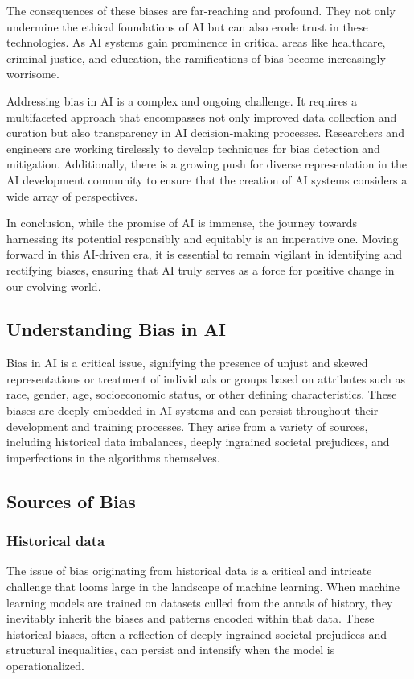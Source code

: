 \documentclass[12pt,a4paper,openright,twoside]{book}
\begin{document}
The consequences of these biases are far-reaching and profound. They not only undermine the ethical foundations of AI but can also erode trust in these technologies. As AI systems gain prominence in critical areas like healthcare, criminal justice, and education, the ramifications of bias become increasingly worrisome. 

Addressing bias in AI is a complex and ongoing challenge. It requires a multifaceted approach that encompasses not only improved data collection and curation but also transparency in AI decision-making processes. Researchers and engineers are working tirelessly to develop techniques for bias detection and mitigation. Additionally, there is a growing push for diverse representation in the AI development community to ensure that the creation of AI systems considers a wide array of perspectives. 

In conclusion, while the promise of AI is immense, the journey towards harnessing its potential responsibly and equitably is an imperative one. Moving forward in this AI-driven era, it is essential to remain vigilant in identifying and rectifying biases, ensuring that AI truly serves as a force for positive change in our evolving world. \cite{10.1145/3308560.3317590}

\subsection{Understanding Bias in AI}

Bias in AI is a critical issue, signifying the presence of unjust and skewed representations or treatment of individuals or groups based on attributes such as race, gender, age, socioeconomic status, or other defining characteristics. These biases are deeply embedded in AI systems and can persist throughout their development and training processes. They arise from a variety of sources, including historical data imbalances, deeply ingrained societal prejudices, and imperfections in the algorithms themselves.

\subsection{Sources of Bias}

\subsubsection{Historical data} 

The issue of bias originating from historical data is a critical and intricate challenge that looms large in the landscape of machine learning. When machine learning models are trained on datasets culled from the annals of history, they inevitably inherit the biases and patterns encoded within that data. These historical biases, often a reflection of deeply ingrained societal prejudices and structural inequalities, can persist and intensify when the model is operationalized. \cite{10.1145/3308560.3317590}
\end{document}
